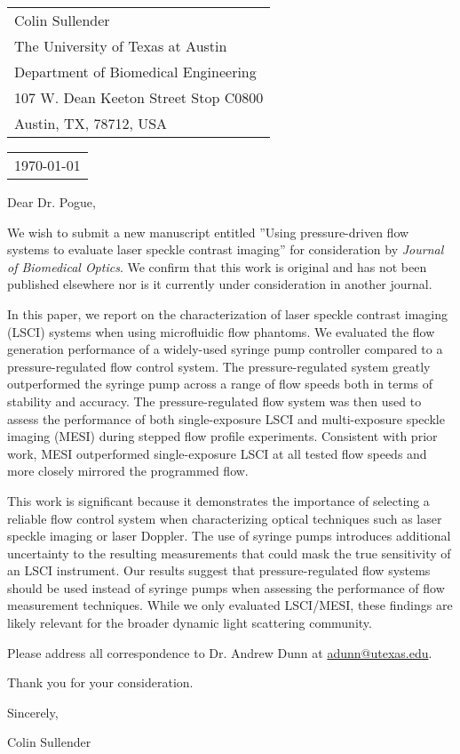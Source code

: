 \documentclass{article}
\begin{document}
\hfill
\begin{tabular}{ l @{} }
    Colin Sullender\\
    The University of Texas at Austin\\
    Department of Biomedical Engineering\\
    107 W. Dean Keeton Street Stop C0800\\
    Austin, TX, 78712, USA
\end{tabular}

\bigskip\bigskip

\begin{tabular}{ @{} l }
    \today \\[12pt] %
\end{tabular}
  
\bigskip

Dear Dr. Pogue,

\bigskip

We wish to submit a new manuscript entitled ''Using pressure-driven flow systems to evaluate laser speckle contrast imaging'' for consideration by \emph{Journal of Biomedical Optics}. We confirm that this work is original and has not been published elsewhere nor is it currently under consideration in another journal.

In this paper, we report on the characterization of laser speckle contrast imaging (LSCI) systems when using microfluidic flow phantoms. We evaluated the flow generation performance of a widely-used syringe pump controller compared to a pressure-regulated flow control system. The pressure-regulated system greatly outperformed the syringe pump across a range of flow speeds both in terms of stability and accuracy. The pressure-regulated flow system was then used to assess the performance of both single-exposure LSCI and multi-exposure speckle imaging (MESI) during stepped flow profile experiments. Consistent with prior work, MESI outperformed single-exposure LSCI at all tested flow speeds and more closely mirrored the programmed flow.

This work is significant because it demonstrates the importance of selecting a reliable flow control system when characterizing optical techniques such as laser speckle imaging or laser Doppler. The use of syringe pumps introduces additional uncertainty to the resulting measurements that could mask the true sensitivity of an LSCI instrument. Our results suggest that pressure-regulated flow systems should be used instead of syringe pumps when assessing the performance of flow measurement techniques. While we only evaluated LSCI/MESI, these findings are likely relevant for the broader dynamic light scattering community.

Please address all correspondence to Dr. Andrew Dunn at \underline{adunn@utexas.edu}.

Thank you for your consideration.

\bigskip

Sincerely,

\vspace{50pt}

Colin Sullender
\end{document}
